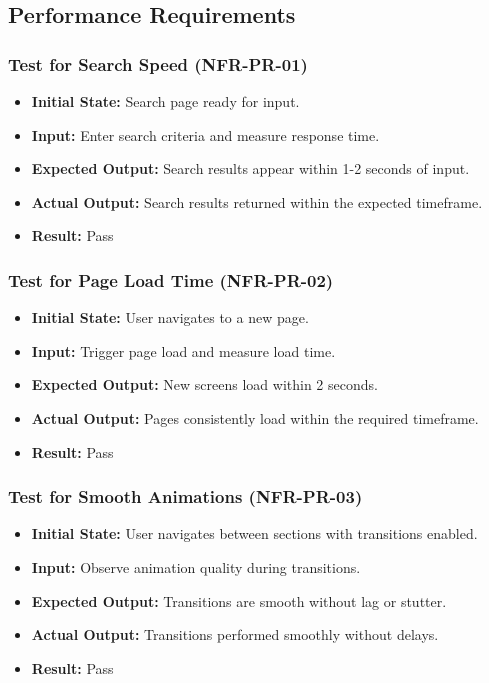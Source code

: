 \documentclass[12pt, titlepage]{article}
\begin{document}
\subsection{Performance Requirements}

\subsubsection{Test for Search Speed (NFR-PR-01)}
\begin{itemize}
    \item \textbf{Initial State: }Search page ready for input.
    \item \textbf{Input: }Enter search criteria and measure response time.
    \item \textbf{Expected Output: }Search results appear within 1-2 seconds of input.
    \item \textbf{Actual Output: }Search results returned within the expected timeframe.
    \item \textbf{Result: }Pass
\end{itemize}

\subsubsection{Test for Page Load Time (NFR-PR-02)}
\begin{itemize}
    \item \textbf{Initial State: }User navigates to a new page.
    \item \textbf{Input: }Trigger page load and measure load time.
    \item \textbf{Expected Output: }New screens load within 2 seconds.
    \item \textbf{Actual Output: }Pages consistently load within the required timeframe.
    \item \textbf{Result: }Pass
\end{itemize}

\subsubsection{Test for Smooth Animations (NFR-PR-03)}
\begin{itemize}
    \item \textbf{Initial State: }User navigates between sections with transitions enabled.
    \item \textbf{Input: }Observe animation quality during transitions.
    \item \textbf{Expected Output: }Transitions are smooth without lag or stutter.
    \item \textbf{Actual Output: }Transitions performed smoothly without delays.
    \item \textbf{Result: }Pass
\end{itemize}
\end{document}
